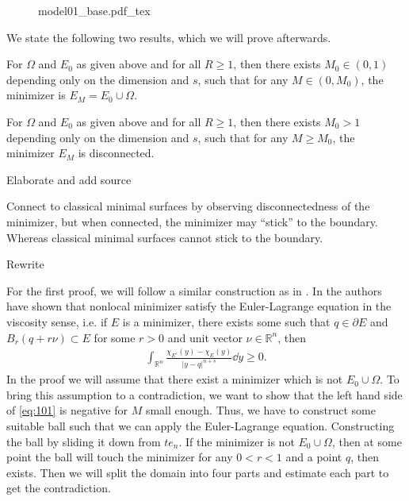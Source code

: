 \begin{figure}[h]
	\centering
	\def\svgwidth{0.5\textwidth}
	{model01_base.pdf_tex}
	\caption{}
	\label{fig:101}
\end{figure}

We state the following two results, which we will prove afterwards.

\begin{theorem}
	\label{thm:101}
	For \( \Omega \) and \( E_0 \) as given above and for all \( R \geq 1 \), then there
	exists \( M_0 \in (0,1) \) depending only on the dimension and \( s \), such that for
	any \( M \in (0, M_0) \), the minimizer is \( E_M = E_0 \cup \Omega \).
\end{theorem}

\begin{theorem}
	\label{thm:102}
	For \( \Omega \) and \( E_0 \) as given above and for all \( R \geq 1 \), then there
	exists \( M_0 > 1 \) depending only on the dimension and \( s \), such that for any \(
	M \geq M_0 \), the minimizer \( E_M \) is disconnected.
\end{theorem}


\begin{TODO}
	Elaborate and add source
\end{TODO}
Connect to classical minimal surfaces by observing disconnectedness of the minimizer, but
when connected, the minimizer may \enquote{stick} to the boundary. Whereas classical
minimal surfaces cannot stick to the boundary.


\begin{TODO}
	Rewrite
\end{TODO}
For the first proof, we will follow a similar construction as in
\cite{dipierro2020disconnectedness}.\newline
In \cite{caffarelli2009nonlocal} the authors have shown that nonlocal minimizer satisfy
the Euler-Lagrange equation in the viscosity sense, i.e. if \( E \) is a minimizer, there
exists some such that \( q \in \partial E \) and \( B_r (q+r \nu) \subset E \) for some \(
r > 0 \) and unit vector \( \nu \in \mathbb{R}^n \), then
\begin{gather}
	\int_{\mathbb{R}^n} \frac{\chi_{E^c}(y)-\chi_E (y)}{\lvert y-q\rvert^{n+s}} \dd{y} \geq 0. \label{eq:101}
\end{gather}
In the proof we will assume that there exist a minimizer which is not \( E_0 \cup \Omega
\). To bring this assumption to a contradiction, we want to show that the left hand side
of \cref{eq:101} is negative for \( M \) small enough. Thus, we have to construct some
suitable ball such that we can apply the Euler-Lagrange equation. Constructing the ball by
sliding it down from \( t e_n \). If the minimizer is not \( E_0 \cup \Omega \), then at
some point the ball will touch the minimizer for any \( 0 < r < 1 \) and a point \( q \),
then exists. Then we will split the domain into four parts and estimate each part to get
the contradiction.

